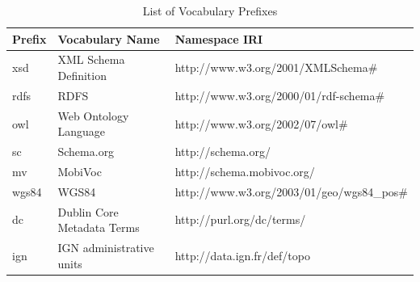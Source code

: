 \begin{table}[]
	\centering
	\begin{tabular}{|l|l|l|}
		\hline
		\textbf{Prefix} & \textbf{Vocabulary Name} & \textbf{Namespace IRI}                       \\ \hline
		xsd             & XML Schema Definition    & http://www.w3.org/2001/XMLSchema\#           \\ \hline
		rdfs            & RDFS                     & http://www.w3.org/2000/01/rdf-schema\#       \\ \hline
		owl				& Web Ontology Language    & http://www.w3.org/2002/07/owl\#               \\ \hline
		sc              & Schema.org               & http://schema.org/                           \\ \hline
		mv              & MobiVoc                  & http://schema.mobivoc.org/                   \\ \hline
		
		wgs84           & WGS84                    & http://www.w3.org/2003/01/geo/wgs84\_pos\#   \\ \hline
		dc           & Dublin Core Metadata Terms                    & http://purl.org/dc/terms/   \\ \hline
		ign           & IGN administrative units                    & http://data.ign.fr/def/topo   \\ \hline
		
	\end{tabular}
	\caption{List of Vocabulary Prefixes}
	\label{tab:prefixList}
\end{table}